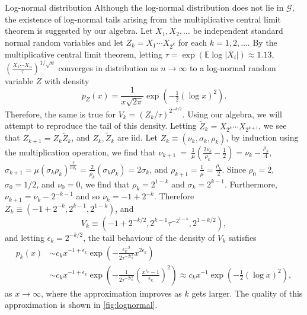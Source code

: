 \documentclass[thesis.tex]{subfiles}
\begin{document}
\begin{example}{Log-normal distribution}
	Although the log-normal distribution does not lie in $\mathcal{G}$, the existence of log-normal tails arising from the multiplicative central limit theorem is suggested by our algebra. Let $X_1,X_2,\dots$ be independent standard normal random variables and let $Z_k = X_1\cdots X_{2^k}$ for each $k=1,2,\dots$. By the multiplicative central limit theorem, letting $\tau = \exp(\mathbb{E}\log |X_i|) \approx 1.13$, $\left(\frac{X_{1}\cdots X_{n}}{\tau}\right)^{1/\sqrt{n}}$ converges in distribution as $n\to\infty$ to a log-normal random variable $Z$ with density
	\[
		p_Z(x) = \frac{1}{x\sqrt{2\pi}} \exp(-\tfrac12 (\log x)^2).
	\]
	Therefore, the same is true for $V_k = (Z_k / \tau)^{2^{-k/2}}$. Using our algebra, we will attempt to reproduce the tail of this density. Letting $\tilde{Z}_k = X_{2^k} \cdots X_{2^{k+1}}$, we see that $Z_{k+1} = Z_k \tilde{Z}_k$, and $Z_k,\tilde{Z}_k$ are iid. Let $Z_k \equiv (\nu_k, \sigma_k, \rho_k)$, by induction using the multiplication operation, we find that $\nu_{k+1} ~=~\frac{1}{\mu}\left(\frac{2\nu_{k}}{\rho_{k}}-\frac{1}{2}\right)=\nu_{k}-\frac{\rho_{k}}{4}$, $\sigma_{k+1}=\mu\left(\sigma_{k}\rho_{k}\right)^{\frac{2}{\mu\rho_{k}}}=\frac{2}{\rho_{k}}\left(\sigma_{k}\rho_{k}\right)=2\sigma_{k}$, and $\rho_{k+1}=\frac{1}{\mu}=\frac{\rho_{k}}{2}$.
	Since $\rho_0 = 2$, $\sigma_0 = 1/2$, and $\nu_0 = 0$, we find that $\rho_k = 2^{1-k}$ and $\sigma_k = 2^{k-1}$. Furthermore, $\nu_{k+1} = \nu_k - 2^{-k-1}$ and so $\nu_k = -1 + 2^{-k}$. Therefore $Z_k \equiv (-1+2^{-k},2^{k-1},2^{1-k})$, and
	\[
		V_k \equiv (-1+2^{-k/2},2^{k-1}\tau^{-2^{1-k}},2^{1-k/2}),
	\]
	and letting $\epsilon_k = 2^{-k/2}$, the tail behaviour of the density of $V_k$ satisfies
	\begin{align*}
		p_k(x) & \sim c_k x^{-1+\epsilon_{k}}\exp\left(-\frac{\epsilon_{k}^{-2}}{2\tau^{-2\epsilon_{k}^{2}}}x^{2\epsilon_k}\right) \\& \sim c_k x^{-1+\epsilon_{k}}\exp\left(-\frac{1}{2\tau^{-2\epsilon_{k}^{2}}}\left(\frac{x^{\epsilon_{k}}-1}{\epsilon_{k}}\right)^{2}\right) \approx c_k x^{-1}\exp\left(-\frac{1}{2}(\log x)^2\right),
	\end{align*}
	as $x \to \infty$, where the approximation improves as $k$ gets larger. The quality of this approximation is shown in \cref{fig:lognormal}.
\end{example}
\end{document}
